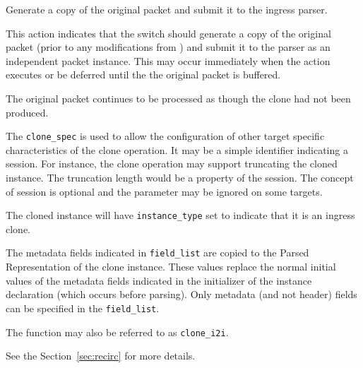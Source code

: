 \documentclass[12pt]{article}
\begin{document}

{ %
Generate a copy of the original packet and submit it to the ingress parser.
}
{ %
}
{ %
This action indicates that the switch should generate a copy of the original 
packet (prior to any modifications from \matchaction) and submit it to the 
parser as an independent packet instance.  This may occur immediately when 
the action executes or be deferred until the the original packet is buffered. 
 

The original packet continues to be processed as though the clone had not 
been produced.

The \texttt{clone_spec} is used to allow the configuration of other target specific 
characteristics of the clone operation. It may be a simple identifier indicating 
a session. For instance, the clone operation may support truncating the cloned 
instance. The truncation length would be a property of the session. The concept 
of session is optional and the parameter may be ignored on some targets.

The cloned instance will have \texttt{instance_type} set to indicate that it is an 
ingress clone. 

The metadata fields indicated in \texttt{field_list} are copied to the Parsed Representation 
of the clone instance. These values replace the normal initial values of the 
metadata fields indicated in the initializer of the instance declaration (which 
occurs before parsing). Only metadata (and not header) fields can be specified in the \texttt{field_list}.

The function may also be referred to as \texttt{clone_i2i}.

See the Section~\ref{sec:recirc} for more details.
}

\end{document}
